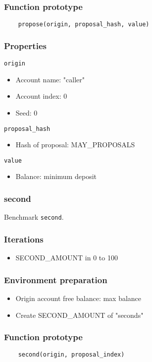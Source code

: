 \documentclass[11pt,a4paper]{article}
\begin{document}
\subsubsection*{Function prototype}
\begin{verbatim}
    propose(origin, proposal_hash, value)
\end{verbatim}

\subsubsection*{Properties}
\verb|origin|
\begin{itemize}
    \item Account name: "caller"
    \item Account index: 0 
    \item Seed: 0
\end{itemize}
\verb|proposal_hash|
\begin{itemize}
    \item Hash of proposal: MAY\_PROPOSALS
\end{itemize}
\verb|value|
\begin{itemize}
    \item Balance: minimum deposit
\end{itemize}

\subsubsection{second}

Benchmark \verb|second|.

\subsubsection*{Iterations}
\begin{itemize}
    \item SECOND\_AMOUNT in 0 to 100
\end{itemize}

\subsubsection*{Environment preparation}
\begin{itemize}
    \item Origin account free balance: max balance
    \item Create SECOND\_AMOUNT of "seconds"
\end{itemize}

\subsubsection*{Function prototype}
\begin{verbatim}
    second(origin, proposal_index)
\end{verbatim}
\end{document}
